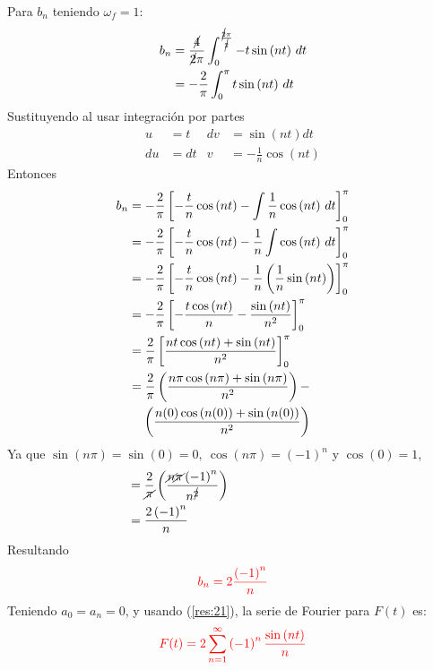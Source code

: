 \begin{multicols}{2}
Para $b_n$ teniendo $\omega_f = 1$:
\begin{align*}
    b_n &= \frac{\cancel{4}}{\cancel{2}\pi} \int_{0}^{\frac{\cancel{2}\pi}{\cancel{2}}} -t\sin\left(n t\right) \,dt\\
    &= -\frac{2}{\pi} \int_{0}^{\pi} t\sin\left(n t\right) \,dt
\end{align*}
Sustituyendo al usar integración por partes
\begin{align*}
    u&=t           &  dv&=\sin\left(nt\right) dt\\
    du&=dt         &  v&=-\frac{1}{n} \cos\left(nt\right)
\end{align*}
Entonces
\begin{align*}
    b_n &= -\frac{2}{\pi} \left[-\frac{t}{n}\cos\left(nt\right) - \int \frac{1}{n} \cos\left(n t\right) \,dt\right]_{0}^{\pi}\\
    &= -\frac{2}{\pi} \left[-\frac{t}{n}\cos\left(nt\right) - \frac{1}{n} \int \cos\left(n t\right) \,dt\right]_{0}^{\pi}\\
    &= -\frac{2}{\pi} \left[-\frac{t}{n}\cos\left(nt\right) - \frac{1}{n} \left(\frac{1}{n} \sin\left(nt\right)\right)\right]_{0}^{\pi}\\
    &= -\frac{2}{\pi} \left[-\frac{t\cos\left(nt\right)}{n} - \frac{\sin\left(nt\right)}{n^{2}}\right]_{0}^{\pi}\\
    &= \frac{2}{\pi} \left[\frac{nt \cos\left(nt\right) + \sin\left(nt\right)}{n^{2}}\right]_{0}^{\pi}\\
    &= \frac{2}{\pi} \left(\frac{n\pi \cos\left(n\pi\right) + \sin\left(n\pi\right)}{n^{2}}\right) -\\
    &\hphantom{=}~ \left(\frac{n(0) \cos\left(n(0)\right) + \sin\left(n(0)\right)}{n^{2}}\right)
\end{align*}
Ya que $\sin\left(n\pi\right) = \sin\left(0\right) = 0,~ \cos\left(n\pi\right) = \left(-1\right)^{n}$ y $\cos\left(0\right) = 1$,
\begin{align*}
    &= \frac{2}{\cancel{\pi}} \left(\frac{\cancel{n}\cancel{\pi}\left(-1\right)^{n}}{n^{\cancel{2}}}\right) \hphantom{,~tomando~n~impar}\\
    &= \frac{2\left(-1\right)^{n}}{n}
\end{align*}
Resultando
\begin{equation}
    \textcolor{rojo}{b_n = 2 \frac{\left(-1\right)^{n}}{n}}
    \label{res:21}
\end{equation}
Teniendo $a_0 = a_n = 0$, y usando (\ref{res:21}), la serie de Fourier para $F(t)$ es:
\begin{equation*}
    \textcolor{rojo}{F(t) = 2 \sum_{n=1}^{\infty} \left(-1\right)^{n} \frac{\sin\left(nt\right)}{n}}
\end{equation*}


\end{multicols}
